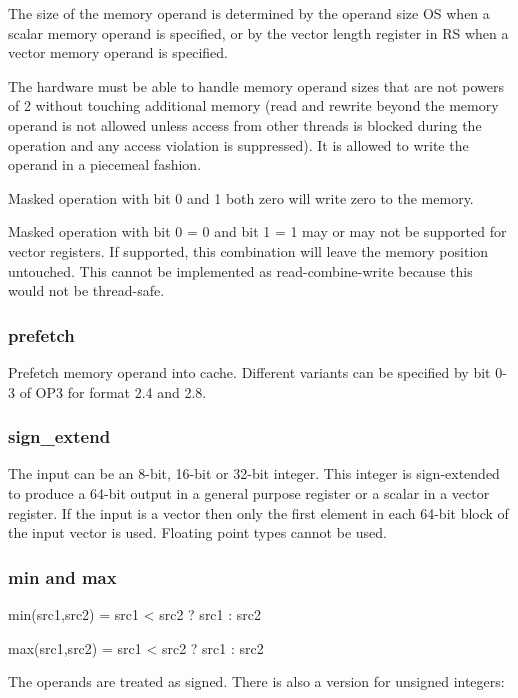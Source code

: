 \documentclass[forwardcom.tex]{subfiles}
\begin{document}
The size of the memory operand is determined by the operand size OS when a scalar memory operand is specified, or by the vector length register in RS when a vector memory operand is specified.
\vspace{2mm}

The hardware must be able to handle memory operand sizes that are not powers of 2 without touching additional memory (read and rewrite beyond the memory operand is not allowed unless access from other threads is blocked during the operation and any access violation is suppressed). It is allowed to write the operand in a piecemeal fashion.
\vspace{2mm}

Masked operation with bit 0 and 1 both zero will write zero to the memory. 
\vspace{2mm}

Masked operation with bit 0 = 0 and bit 1 = 1 may or may not be supported for vector registers. If supported, this combination will leave the memory position untouched. This cannot be implemented as read-combine-write because this would not be thread-safe.

\subsubsection{prefetch}
Prefetch memory operand into cache. Different variants can be specified by bit 0-3 of OP3 for format 2.4 and 2.8.

\subsubsection{sign\_extend}
The input can be an 8-bit, 16-bit or 32-bit integer. This integer is sign-extended to produce a 64-bit output in a general purpose register or a scalar in a vector register. If the input is a vector then only the first element in each 64-bit block of the input vector is used. Floating point types cannot be used.

\subsubsection{min and max}
min(src1,src2) = src1 \textless{} src2 ? src1 : src2

max(src1,src2) = src1 \textless{} src2 ? src1 : src2
\vspace{2mm}

The operands are treated as signed. There is also a version for unsigned integers:
\vspace{2mm}
\end{document}
